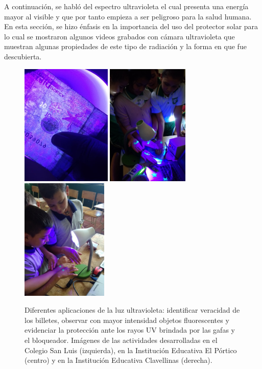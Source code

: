 \documentclass[a4paper,10pt]{article}
\begin{document}
\noindent A continuación, se habló del espectro ultravioleta el cual presenta una energía mayor al visible y que por tanto empieza a ser peligroso para la salud humana. En esta sección, se hizo énfasis en la importancia del uso del protector solar para lo cual se mostraron algunos videos grabados con cámara ultravioleta que muestran algunas propiedades de este tipo de radiación y la forma en que fue descubierta. \\


\begin{figure}[H]
    \centering
    \includegraphics[height=5.8cm]{Imagenes/uv1.jpeg}
    \includegraphics[height=5.8cm]{Imagenes/ultraportico.jpg}
    \includegraphics[height=5.8cm]{Imagenes/ultraclave.jpg}
    
    \caption{Diferentes aplicaciones de la luz ultravioleta: identificar veracidad de los billetes, observar con mayor intensidad objetos fluorescentes y evidenciar la protección ante los rayos UV brindada por las gafas y el bloqueador. Imágenes de las actividades desarrolladas en el Colegio San Luis (izquierda), en la Institución Educativa El Pórtico (centro) y en la Institución Educativa Clavellinas (derecha). }
\end{figure}
\end{document}
